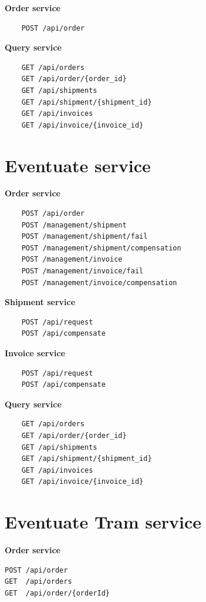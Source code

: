 \documentclass[oneside,
  digital, %
  table,   %
  lof,     %
  lot,     %
]{fithesis3}
\begin{document}
\textbf{Order service}

\begin{verbatim}
    POST /api/order
\end{verbatim}

\noindent
\textbf{Query service}

\begin{verbatim}
    GET /api/orders
    GET /api/order/{order_id}
    GET /api/shipments
    GET /api/shipment/{shipment_id}
    GET /api/invoices
    GET /api/invoice/{invoice_id}
\end{verbatim}

\section{Eventuate service}

\textbf{Order service}

\begin{verbatim}
    POST /api/order
    POST /management/shipment
    POST /management/shipment/fail
    POST /management/shipment/compensation
    POST /management/invoice
    POST /management/invoice/fail
    POST /management/invoice/compensation
\end{verbatim}

\noindent
\textbf{Shipment service}

\begin{verbatim}
    POST /api/request
    POST /api/compensate
\end{verbatim}

\noindent
\textbf{Invoice service}

\begin{verbatim}
    POST /api/request
    POST /api/compensate
\end{verbatim}

\noindent
\textbf{Query service}

\begin{verbatim}
    GET /api/orders
    GET /api/order/{order_id}
    GET /api/shipments
    GET /api/shipment/{shipment_id}
    GET /api/invoices
    GET /api/invoice/{invoice_id}
\end{verbatim}

\section{Eventuate Tram service}

\textbf{Order service}

\begin{verbatim}
POST /api/order
GET  /api/orders
GET  /api/order/{orderId}
\end{verbatim}
\end{document}
